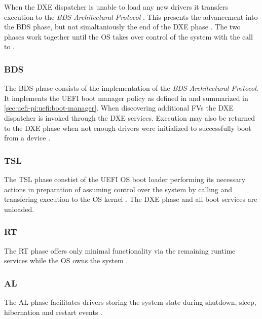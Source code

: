 When the \ac{DXE} dispatcher is unable to load any new drivers it transfers execution to the \emph{\ac{BDS} Architectural Protocol} \cite[Vol. 2, 2.4]{pi-spec}.
This presents the advancement into the \ac{BDS} phase, but not simaltaniously the end of the \ac{DXE} phase \cite[Vol. 2, 2.1]{pi-spec}.
The two phases work together until the \ac{OS} takes over control of the system with the call to .

\subsubsection{\acf{BDS}}

The \ac{BDS} phase consists of the implementation of the \emph{\ac{BDS} Architectural Protocol}.
It implements the \ac{UEFI} boot manager policy as defined in \cite[Section 3]{uefi-spec} and summarized in \autoref{sec:uefi-pi:uefi:boot-manager}.
When discovering additional \acp{FV} the \ac{DXE} dispatcher is invoked through the \ac{DXE} services.
Execution may also be returned to the \ac{DXE} phase when not enough drivers were initialized to successfully boot from a device \cite[Vol. 2, 12.2]{pi-spec}.


\subsubsection{\acf{TSL}}

The \ac{TSL} phase constist of the \ac{UEFI} \ac{OS} boot loader performing its necessary actions in preparation of assuming control over the system by calling  and transfering execution to the \ac{OS} kernel \cite[Section 2.3]{tianocore-edk2-build-spec}.
The \ac{DXE} phase and all boot services are unloaded.

\subsubsection{\acf{RT}}

The \ac{RT} phase offers only minimal functionality via the remaining runtime services while the \ac{OS} owns the system \cite[Section 2.3]{tianocore-edk2-build-spec}.

\subsubsection{\acf{AL}}

The \ac{AL} phase facilitates drivers storing the system state during shutdown, sleep, hibernation and restart events \cite[Section 2.3]{tianocore-edk2-build-spec}.
